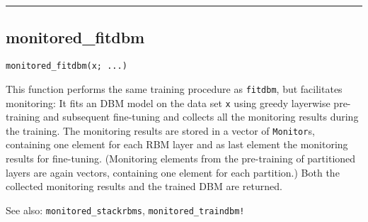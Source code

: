 \noindent\rule{\textwidth}{1pt}
\subsection*{monitored\_fitdbm}  \label{bms_monitored_fitdbm}
\begin{verbatim}
monitored_fitdbm(x; ...)
\end{verbatim}
This function performs the same training procedure as \texttt{fitdbm}, but facilitates monitoring: It fits an DBM model on the data set \texttt{x} using greedy layerwise pre-training and subsequent fine-tuning and collects all the monitoring results during the training. The monitoring results are stored in a vector of \texttt{Monitor}s, containing one element for each RBM layer and as last element the monitoring results for fine-tuning. (Monitoring elements from the pre-training of partitioned layers are again vectors, containing one element for each partition.) Both the collected monitoring results and the trained DBM are returned.

See also: \texttt{monitored\_stackrbms}, \texttt{monitored\_traindbm!}

